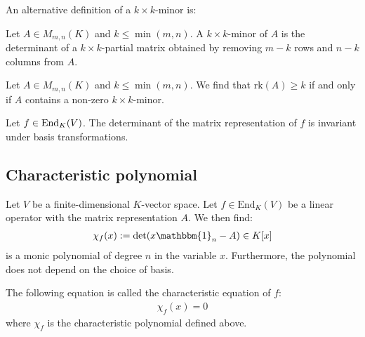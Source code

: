         An alternative definition of a $k\times k$-minor is:
        \begin{adefinition}[Minor]
		Let $A\in M_{m,n}(K)$ and $k\leq\min(m, n)$. A $k\times k$-minor of $A$ is the determinant of a $k\times k$-partial matrix obtained by removing $m-k$ rows and $n-k$ columns from $A$.
	\end{adefinition}
        \begin{property}
		Let $A\in M_{m,n}(K)$ and $k\leq\min(m, n)$. We find that $\text{rk}(A)\geq k$ if and only if $A$ contains a non-zero $k\times k$-minor.
	\end{property}

        \begin{property}
		Let $f\in\textup{End}_K(V)$. The determinant of the matrix representation of $f$ is invariant under basis transformations.
	\end{property}

\subsection{Characteristic polynomial}

    	\begin{definition}\label{linalgebra:characteristic_polynomial}
		Let $V$ be a finite-dimensional $K$-vector space. Let $f\in \text{End}_K(V)$ be a linear operator with the matrix representation $A$. We then find:
		\begin{gather}
                	\chi_f(x) := \det(x\mathbbm{1}_n - A) \in K[x]
		\end{gather}
		is a monic polynomial of degree $n$ in the variable $x$. Furthermore, the polynomial does not depend on the choice of basis.
	\end{definition}

        \begin{definition}
		The following equation is called the characteristic equation of $f$:
	        \begin{gather}
            		\label{linalgebra:characteristic_equation}
			\chi_f(x) = 0
		\end{gather}
		where $\chi_f$ is the characteristic polynomial defined above.
	\end{definition}

